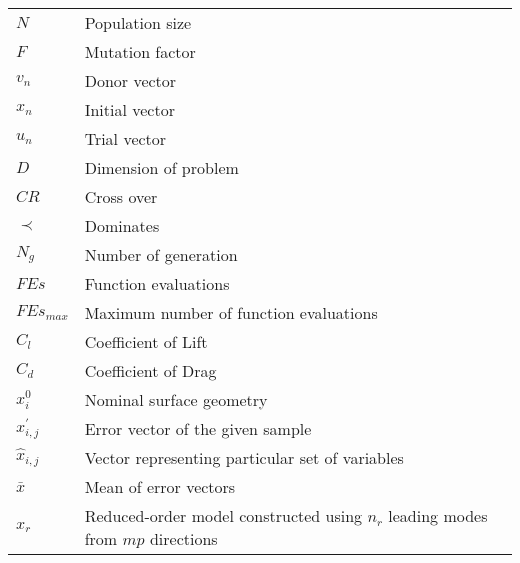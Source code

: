 \begin{longtable}[l]{l l}
$N$ & Population size\\
$F$ & Mutation factor \\
$v_n$ & Donor vector\\
$x_n$ & Initial vector\\
$u_n$ & Trial vector\\
$D$ & Dimension of problem\\
$CR$ & Cross over\\
$\prec$ & Dominates\\
$N_g$ & Number of generation\\
$FEs$ & Function evaluations\\
$FEs_{max}$ & Maximum number of function evaluations\\
$C_l$ & Coefficient of Lift\\
$C_d$ & Coefficient of Drag\\
$x_i^0$ & Nominal surface geometry\\
$x_{i,j}^{\prime}$ & Error vector of the given sample\\
$\hat{x}_{i,j}$ & Vector representing particular set of variables\\
$\bar{x}$ & Mean of error vectors\\ 
$x_r$ & Reduced-order model constructed using $n_r$ leading modes from $mp$ directions\\
\end{longtable}
